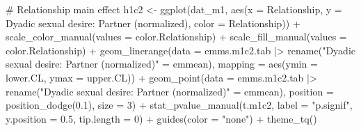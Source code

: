\documentclass[
  bookmarksnumbered]{article}
\newenvironment{Shaded}{\begin{snugshade}}{\end{snugshade}}
\newcommand{\AttributeTok}[1]{\textcolor[rgb]{0.80,0.80,0.80}{#1}}
\newcommand{\CommentTok}[1]{\textcolor[rgb]{0.50,0.62,0.50}{#1}}
\newcommand{\DecValTok}[1]{\textcolor[rgb]{0.86,0.86,0.80}{#1}}
\newcommand{\FloatTok}[1]{\textcolor[rgb]{0.75,0.75,0.82}{#1}}
\newcommand{\FunctionTok}[1]{\textcolor[rgb]{0.94,0.94,0.56}{#1}}
\newcommand{\NormalTok}[1]{\textcolor[rgb]{0.80,0.80,0.80}{#1}}
\newcommand{\OtherTok}[1]{\textcolor[rgb]{0.94,0.94,0.56}{#1}}
\newcommand{\SpecialCharTok}[1]{\textcolor[rgb]{0.86,0.64,0.64}{#1}}
\newcommand{\StringTok}[1]{\textcolor[rgb]{0.80,0.58,0.58}{#1}}
\begin{document}
\begin{Shaded}
\begin{Highlighting}[]
\CommentTok{\# Relationship main effect}
\NormalTok{h1c2 }\OtherTok{\textless{}{-}} \FunctionTok{ggplot}\NormalTok{(dat\_m1, }\FunctionTok{aes}\NormalTok{(}\AttributeTok{x =}\NormalTok{ Relationship, }\AttributeTok{y =} \StringTok{\textasciigrave{}}\AttributeTok{Dyadic sexual desire: Partner (normalized)}\StringTok{\textasciigrave{}}\NormalTok{, }
                          \AttributeTok{color =}\NormalTok{ Relationship)) }\SpecialCharTok{+}
  \FunctionTok{scale\_color\_manual}\NormalTok{(}\AttributeTok{values =}\NormalTok{ color.Relationship) }\SpecialCharTok{+}
  \FunctionTok{scale\_fill\_manual}\NormalTok{(}\AttributeTok{values =}\NormalTok{ color.Relationship) }\SpecialCharTok{+}
  \FunctionTok{geom\_linerange}\NormalTok{(}\AttributeTok{data =}\NormalTok{ emms.m1c2.tab }\SpecialCharTok{|\textgreater{}} 
                  \FunctionTok{rename}\NormalTok{(}\StringTok{"Dyadic sexual desire: Partner (normalized)"} \OtherTok{=}\NormalTok{ emmean),}
                \AttributeTok{mapping =} \FunctionTok{aes}\NormalTok{(}\AttributeTok{ymin =}\NormalTok{ lower.CL, }\AttributeTok{ymax =}\NormalTok{ upper.CL)) }\SpecialCharTok{+}
  \FunctionTok{geom\_point}\NormalTok{(}\AttributeTok{data =}\NormalTok{ emms.m1c2.tab }\SpecialCharTok{|\textgreater{}} 
                  \FunctionTok{rename}\NormalTok{(}\StringTok{"Dyadic sexual desire: Partner (normalized)"} \OtherTok{=}\NormalTok{ emmean), }
             \AttributeTok{position =} \FunctionTok{position\_dodge}\NormalTok{(}\FloatTok{0.1}\NormalTok{), }
             \AttributeTok{size =} \DecValTok{3}\NormalTok{) }\SpecialCharTok{+}
  \FunctionTok{stat\_pvalue\_manual}\NormalTok{(t.m1c2, }
                     \AttributeTok{label =} \StringTok{"p.signif"}\NormalTok{, }
                     \AttributeTok{y.position =} \FloatTok{0.5}\NormalTok{, }
                     \AttributeTok{tip.length =} \DecValTok{0}\NormalTok{) }\SpecialCharTok{+}
  \FunctionTok{guides}\NormalTok{(}\AttributeTok{color =} \StringTok{"none"}\NormalTok{) }\SpecialCharTok{+}
  \FunctionTok{theme\_tq}\NormalTok{()}


\end{Highlighting}
\end{Shaded}
\end{document}
